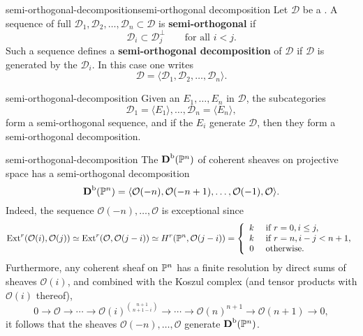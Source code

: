 \begin{topic}{semi-orthogonal-decomposition}{semi-orthogonal decomposition}
    Let $\mathcal{D}$ be a . A sequence of full   $\mathcal{D}_1, \mathcal{D}_2, \ldots, \mathcal{D}_n \subset \mathcal{D}$ is \textbf{semi-orthogonal} if
    \[ \mathcal{D}_i \subset \mathcal{D}_j^\perp \qquad \text{for all $i < j$}. \]
    Such a sequence defines a \textbf{semi-orthogonal decomposition} of $\mathcal{D}$ if $\mathcal{D}$ is generated by the $\mathcal{D}_i$. In this case one writes
    \[ \mathcal{D} = \langle \mathcal{D}_1, \mathcal{D}_2, \ldots, \mathcal{D}_n \rangle . \]
\end{topic}

\begin{example}{semi-orthogonal-decomposition}
    Given an  $E_1, \ldots, E_n$ in $\mathcal{D}$, the subcategories
    \[ \mathcal{D}_1 = \langle E_1 \rangle, \ldots, \mathcal{D}_n = \langle E_n \rangle , \]
    form a semi-orthogonal sequence, and if the $E_i$ generate $\mathcal{D}$, then they form a semi-orthogonal decomposition.
\end{example}

\begin{example}{semi-orthogonal-decomposition}
    The  $\textbf{D}^\textup{b}(\mathbb{P}^n)$ of coherent sheaves on projective space has a semi-orthogonal decomposition
    \[ \textbf{D}^\textup{b}(\mathbb{P}^n) = \langle \mathcal{O}(-n), \mathcal{O}(-n + 1), \ldots, \mathcal{O}(-1), \mathcal{O} \rangle . \]
    Indeed, the sequence $\mathcal{O}(-n), \ldots, \mathcal{O}$ is exceptional since
    \[ \textup{Ext}^r(\mathcal{O}(i), \mathcal{O}(j)) \simeq \textup{Ext}^r(\mathcal{O}, \mathcal{O}(j - i)) \simeq H^r(\mathbb{P}^n, \mathcal{O}(j - i)) = \left\{ \begin{array}{cl}
         k & \textup{ if } r = 0, i \le j , \\
         k & \textup{ if } r = n, i - j < n + 1 , \\
         0 & \textup{ otherwise}.
    \end{array} \right. \]
    Furthermore, any coherent sheaf on $\mathbb{P}^n$ has a finite resolution by direct sums of sheaves $\mathcal{O}(i)$, and combined with the Koszul complex (and tensor products with $\mathcal{O}(i)$ thereof),
    \[ 0 \to \mathcal{O} \to \cdots \to \mathcal{O}(i)^{\binom{n + 1}{n + 1 - i}} \to \cdots \to \mathcal{O}(n)^{n + 1} \to \mathcal{O}(n + 1) \to 0 , \]
    it follows that the sheaves $\mathcal{O}(-n), \ldots, \mathcal{O}$ generate $\textbf{D}^\textup{b}(\mathbb{P}^n)$.
\end{example}

